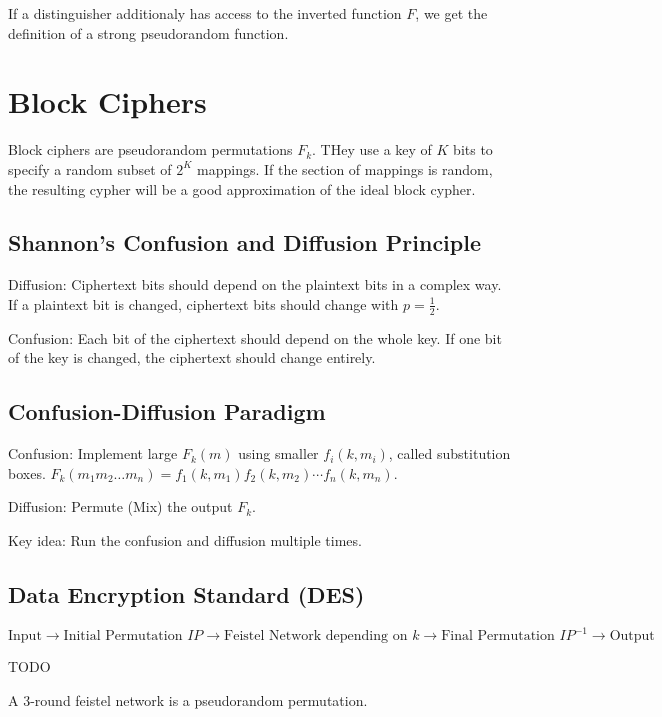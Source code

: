 \documentclass[11pt]{article}
\begin{document}
    If a distinguisher additionaly has access to the inverted function $F$, we get the definition of a strong
    pseudorandom function.

    \section{Block Ciphers}

    Block ciphers are pseudorandom permutations $F_k$. THey use a key of $K$ bits to specify a random
    subset of $2^K$ mappings. If the section of mappings is random, the resulting cypher
    will be a good approximation of the ideal block cypher.

    \subsection{Shannon's Confusion and Diffusion Principle}

    Diffusion: Ciphertext bits should depend on the plaintext bits in a complex way.
    If a plaintext bit is changed, ciphertext bits should change with $p=\frac{1}{2}$.

    Confusion: Each bit of the ciphertext should depend on the whole key.
    If one bit of the key is changed, the ciphertext should change entirely.

    \subsection{Confusion-Diffusion Paradigm}

    Confusion: Implement large $F_k(m)$ using smaller $f_i(k, m_i)$, called substitution boxes.
    $F_k(m_1 m_2 \dotsc m_n) = f_1(k, m_1) f_2(k, m_2) \dotsm f_n(k, m_n)$.

    Diffusion: Permute (Mix) the output $F_k$.

    Key idea: Run the confusion and diffusion multiple times.

    \subsection{Data Encryption Standard (DES)}

    $\textrm{Input} \to \textrm{Initial Permutation } IP \to \textrm{Feistel Network depending on } k \to \textrm{Final Permutation } IP^{-1} \to \textrm{Output}$

    TODO

    A 3-round feistel network is a pseudorandom permutation.
\end{document}
